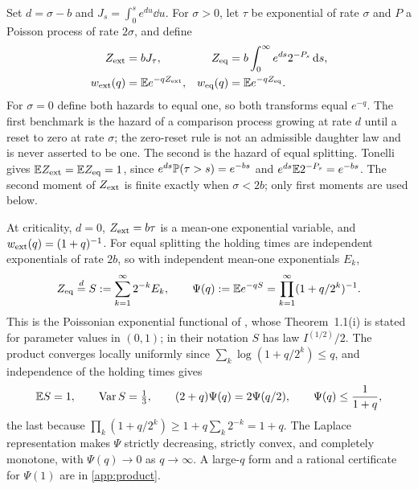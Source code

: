 Set $d=\sigma-b$ and $J_s=\int_0^se^{du}\dd u$. For $\sigma>0$, let
$\tau$ be exponential of rate $\sigma$ and $P$ a Poisson process of
rate $2\sigma$, and define
\begin{align}
 Z_{\rm ext}&=bJ_\tau,&
 Z_{\rm eq}&=b\int_0^\infty e^{ds}2^{-P_s}\,\mathrm d s,
 \label{eq:benchmark-hazards}\\
 w_{\rm ext}(q)&=\mathbb E e^{-qZ_{\rm ext}},&
 w_{\rm eq}(q)&=\mathbb E e^{-qZ_{\rm eq}}.
 \label{eq:benchmark-transforms}
\end{align}
For $\sigma=0$ define both hazards to equal one, so both transforms
equal $e^{-q}$. The first benchmark is the hazard of a comparison
process growing at rate $d$ until a reset to zero at rate $\sigma$;
the zero-reset rule is not an admissible daughter law and is never
asserted to be one. The second is the hazard of equal splitting.
Tonelli gives $\mathbb E Z_{\rm ext}=\mathbb E Z_{\rm eq}=1$, since
$e^{ds}\mathbb P(\tau>s)=e^{-bs}$ and $e^{ds}\mathbb E2^{-P_s}=e^{-bs}$. The
second moment of $Z_{\rm ext}$ is finite exactly when $\sigma<2b$;
only first moments are used below.

At criticality, $d=0$, $Z_{\rm ext}=b\tau$ is a mean-one exponential
variable, and $w_{\rm ext}(q)=(1+q)^{-1}$. For equal splitting the
holding times are independent exponentials of rate $2b$, so with
independent mean-one exponentials $E_k$,
\begin{equation}
 Z_{\rm eq}\overset{d}{=}S:=\sum_{k=1}^\infty2^{-k}E_k,
 \qquad \Psi(q):=\mathbb E e^{-qS}
       =\prod_{k=1}^\infty(1+q/2^k)^{-1}.
 \label{eq:critical-product}
\end{equation}
This is the Poissonian exponential functional of
\citet[equations~(1.3), (1.6), Theorem~1.1(i)]{BertoinBianeYor2004},
whose Theorem~1.1(i) is stated for parameter values in $(0,1)$; in
their notation $S$ has law $I^{(1/2)}/2$. The product converges
locally uniformly since $\sum_k\log(1+q/2^k)\leq q$, and independence
of the holding times gives
\begin{equation}
 \mathbb E S=1,\qquad \operatorname{Var} S=\tfrac13,\qquad
 (2+q)\Psi(q)=2\Psi(q/2),\qquad
 \Psi(q)\leq\frac1{1+q},
 \label{eq:product-identities}
\end{equation}
the last because $\prod_k(1+q/2^k)\geq1+q\sum_k2^{-k}=1+q$. The
Laplace representation makes $\Psi$ strictly decreasing, strictly
convex, and completely monotone, with $\Psi(q)\to0$ as $q\to\infty$.
A large-$q$ form and a rational certificate for $\Psi(1)$ are in
\cref{app:product}.

